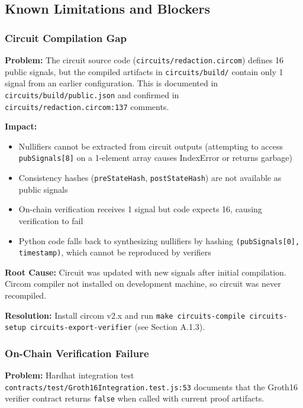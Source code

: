 \subsection{Known Limitations and Blockers}

\subsubsection{Circuit Compilation Gap}

\textbf{Problem:} The circuit source code (\texttt{circuits/redaction.circom}) defines 16 public signals, but the compiled artifacts in \texttt{circuits/build/} contain only 1 signal from an earlier configuration. This is documented in \texttt{circuits/build/public.json} and confirmed in \texttt{circuits/redaction.circom:137} comments.

\textbf{Impact:}
\begin{itemize}
    \item Nullifiers cannot be extracted from circuit outputs (attempting to access \texttt{pubSignals[8]} on a 1-element array causes IndexError or returns garbage)
    \item Consistency hashes (\texttt{preStateHash}, \texttt{postStateHash}) are not available as public signals
    \item On-chain verification receives 1 signal but code expects 16, causing verification to fail
    \item Python code falls back to synthesizing nullifiers by hashing \texttt{(pubSignals[0], timestamp)}, which cannot be reproduced by verifiers
\end{itemize}

\textbf{Root Cause:} Circuit was updated with new signals after initial compilation. Circom compiler not installed on development machine, so circuit was never recompiled.

\textbf{Resolution:} Install circom v2.x and run \texttt{make circuits-compile circuits-setup circuits-export-verifier} (see Section A.1.3).

\subsubsection{On-Chain Verification Failure}

\textbf{Problem:} Hardhat integration test \texttt{contracts/test/Groth16Integration.test.js:53} documents that the Groth16 verifier contract returns \texttt{false} when called with current proof artifacts.

